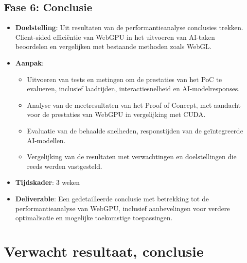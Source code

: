 \subsection*{Fase 6: Conclusie}

\begin{itemize}
  \item \textbf{Doelstelling}: Uit resultaten van de performantieanalyse conclusies trekken. Client-sided efficiëntie van WebGPU in het uitvoeren van AI-taken beoordelen en vergelijken met bestaande methoden zoals WebGL.

  \item \textbf{Aanpak}:
  \begin{itemize}
    \item Uitvoeren van tests en metingen om de prestaties van het PoC te evalueren, inclusief laadtijden, interactiesnelheid en AI-modelresponses.
    \item Analyse van de meetresultaten van het Proof of Concept, met aandacht voor de prestaties van WebGPU in vergelijking met CUDA.
    \item Evaluatie van de behaalde snelheden, responstijden van de geïntegreerde AI-modellen.
    \item Vergelijking van de resultaten met verwachtingen en doelstellingen die reeds werden vastgesteld.
  \end{itemize}

  \item \textbf{Tijdskader}: 3 weken
  \item \textbf{Deliverable}: Een gedetailleerde conclusie met betrekking tot de performantieanalyse van WebGPU, inclusief aanbevelingen voor verdere optimalisatie en mogelijke toekomstige toepassingen.
\end{itemize}

\section{Verwacht resultaat, conclusie}%
\label{sec:verwachte_resultaten}


